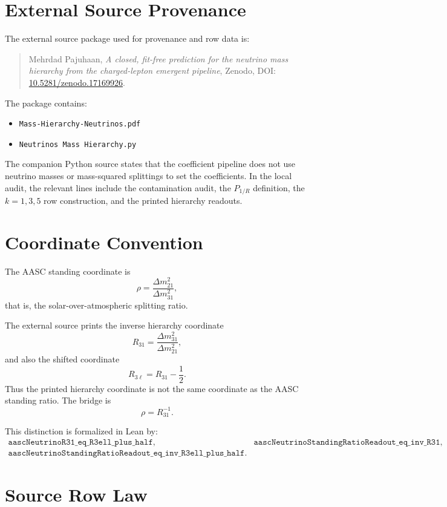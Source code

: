 \documentclass[11pt]{article}
\begin{document}
\section{External Source Provenance}

The external source package used for provenance and row data is:
\begin{quote}
Mehrdad Pajuhaan, \emph{A closed, fit-free prediction for the neutrino mass
hierarchy from the charged-lepton emergent pipeline}, Zenodo,
DOI: \href{https://doi.org/10.5281/zenodo.17169926}{10.5281/zenodo.17169926}.
\end{quote}

The package contains:
\begin{itemize}
  \item \texttt{Mass-Hierarchy-Neutrinos.pdf}
  \item \texttt{Neutrinos Mass Hierarchy.py}
\end{itemize}

The companion Python source states that the coefficient pipeline does not use
neutrino masses or mass-squared splittings to set the coefficients.  In the
local audit, the relevant lines include the contamination audit, the
\(P_{1/R}\) definition, the \(k=1,3,5\) row construction, and the printed
hierarchy readouts.

\section{Coordinate Convention}

The AASC standing coordinate is
\[
  \rho = \frac{\Delta m^2_{21}}{\Delta m^2_{31}},
\]
that is, the solar-over-atmospheric splitting ratio.

The external source prints the inverse hierarchy coordinate
\[
  R_{31} = \frac{\Delta m^2_{31}}{\Delta m^2_{21}},
\]
and also the shifted coordinate
\[
  R_{3\ell} = R_{31} - \frac{1}{2}.
\]
Thus the printed hierarchy coordinate is not the same coordinate as the AASC
standing ratio.  The bridge is
\[
  \rho = R_{31}^{-1}.
\]

This distinction is formalized in Lean by:
\[
\begin{array}{ll}
\texttt{aascNeutrinoR31\_eq\_R3ell\_plus\_half}, &
\texttt{aascNeutrinoStandingRatioReadout\_eq\_inv\_R31},\\
\texttt{aascNeutrinoStandingRatioReadout\_eq\_inv\_R3ell\_plus\_half}.&
\end{array}
\]

\section{Source Row Law}
\end{document}
